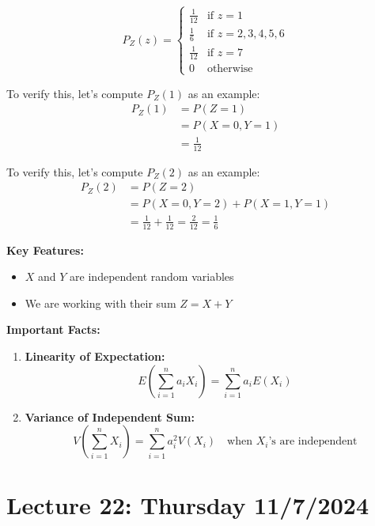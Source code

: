 \documentclass{article}
\begin{document}
    \[
    P_Z(z) = \begin{cases}
        \frac{1}{12} & \text{if } z = 1 \\
        \frac{1}{6}  & \text{if } z = 2,3,4,5,6 \\
        \frac{1}{12} & \text{if } z = 7 \\
        0            & \text{otherwise}
    \end{cases}
    \]

    \noindent
    To verify this, let's compute $P_Z(1)$ as an example:
    \begin{align*}
        P_Z(1) &= P(Z = 1) \\
               &= P(X = 0, Y = 1) \\
               &= \frac{1}{12}
    \end{align*}

    \noindent
    To verify this, let's compute $P_Z(2)$ as an example:
    \begin{align*}
        P_Z(2) &= P(Z = 2) \\
               &= P(X = 0, Y = 2) + P(X = 1, Y = 1) \\
               &= \frac{1}{12} + \frac{1}{12} = \frac{2}{12} = \frac{1}{6}
    \end{align*}
    

    \noindent
    \textbf{Key Features:}
    \begin{itemize}
        \item $X$ and $Y$ are independent random variables
        \item We are working with their sum $Z = X + Y$
    \end{itemize}

    \vspace{0.5em}
    \noindent
    \textbf{Important Facts:}
    \begin{enumerate}
        \item \textbf{Linearity of Expectation:} 
        \[E\left(\sum_{i=1}^n a_i X_i\right) = \sum_{i=1}^n a_iE(X_i)\]
        
        \item \textbf{Variance of Independent Sum:}
        \[V\left(\sum_{i=1}^n X_i\right) = \sum_{i=1}^n a_i^2 V(X_i) \quad \text{when } X_i \text{'s are independent}\]
    \end{enumerate}

    \section*{Lecture 22: Thursday 11/7/2024}
\end{document}
